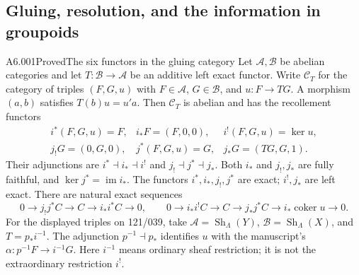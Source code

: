 \subsection{Gluing, resolution, and the information in groupoids}

\begin{saresult}{A6.001}{Proved}{The six functors in the gluing category}
Let $\mathcal A,\mathcal B$ be abelian categories and let
$T:\mathcal B\longrightarrow\mathcal A$ be an additive left exact functor.
Write $\mathcal C_T$ for the category of triples
$(F,G,u)$ with $F\in\mathcal A$, $G\in\mathcal B$, and $u:F\to TG$.
A morphism $(a,b)$ satisfies $T(b)u=u'a$.
Then $\mathcal C_T$ is abelian and has the recollement functors
\[
\begin{array}{lll}
i^*(F,G,u)=F,&i_*F=(F,0,0),&i^!(F,G,u)=\ker u,\\
j_!G=(0,G,0),&j^*(F,G,u)=G,&j_*G=(TG,G,1).
\end{array}
\]
Their adjunctions are $i^*\dashv i_*\dashv i^!$ and
$j_!\dashv j^*\dashv j_*$. Both $i_*$ and $j_!,j_*$ are fully faithful,
and $\ker j^*=\operatorname{im}i_*$. The functors $i^*,i_*,j_!,j^*$
are exact; $i^!,j_*$ are left exact. There are natural exact sequences
\[
0\to j_!j^*C\to C\to i_*i^*C\to0,
\qquad
0\to i_*i^!C\to C\to j_*j^*C
 \to i_*\operatorname{coker}u\to0.
\]
For the displayed triples on 121/039, take
$\mathcal A=\operatorname{Sh}_\Lambda(Y)$,
$\mathcal B=\operatorname{Sh}_\Lambda(X)$, and $T=p_*i^{-1}$.
The adjunction $p^{-1}\dashv p_*$ identifies $u$ with the manuscript's
$\alpha:p^{-1}F\to i^{-1}G$. Here $i^{-1}$ means ordinary sheaf
restriction; it is not the extraordinary restriction $i^!$.
\end{saresult}
